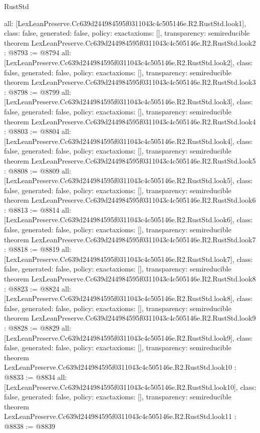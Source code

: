 \begin{lexlean}{RustStd}
\begin{coremodule}
{  all: [LexLeanPreserve.Cc639d244984595f0311043c4c505146e.R2.RustStd.look1],
  class: false,
  generated: false,
  policy: exact{axioms: []},
  transparency: semireducible
}
theorem LexLeanPreserve.Cc639d244984595f0311043c4c505146e.R2.RustStd.look2 : @8793 := @8794 {
  all: [LexLeanPreserve.Cc639d244984595f0311043c4c505146e.R2.RustStd.look2],
  class: false,
  generated: false,
  policy: exact{axioms: []},
  transparency: semireducible
}
theorem LexLeanPreserve.Cc639d244984595f0311043c4c505146e.R2.RustStd.look3 : @8798 := @8799 {
  all: [LexLeanPreserve.Cc639d244984595f0311043c4c505146e.R2.RustStd.look3],
  class: false,
  generated: false,
  policy: exact{axioms: []},
  transparency: semireducible
}
theorem LexLeanPreserve.Cc639d244984595f0311043c4c505146e.R2.RustStd.look4 : @8803 := @8804 {
  all: [LexLeanPreserve.Cc639d244984595f0311043c4c505146e.R2.RustStd.look4],
  class: false,
  generated: false,
  policy: exact{axioms: []},
  transparency: semireducible
}
theorem LexLeanPreserve.Cc639d244984595f0311043c4c505146e.R2.RustStd.look5 : @8808 := @8809 {
  all: [LexLeanPreserve.Cc639d244984595f0311043c4c505146e.R2.RustStd.look5],
  class: false,
  generated: false,
  policy: exact{axioms: []},
  transparency: semireducible
}
theorem LexLeanPreserve.Cc639d244984595f0311043c4c505146e.R2.RustStd.look6 : @8813 := @8814 {
  all: [LexLeanPreserve.Cc639d244984595f0311043c4c505146e.R2.RustStd.look6],
  class: false,
  generated: false,
  policy: exact{axioms: []},
  transparency: semireducible
}
theorem LexLeanPreserve.Cc639d244984595f0311043c4c505146e.R2.RustStd.look7 : @8818 := @8819 {
  all: [LexLeanPreserve.Cc639d244984595f0311043c4c505146e.R2.RustStd.look7],
  class: false,
  generated: false,
  policy: exact{axioms: []},
  transparency: semireducible
}
theorem LexLeanPreserve.Cc639d244984595f0311043c4c505146e.R2.RustStd.look8 : @8823 := @8824 {
  all: [LexLeanPreserve.Cc639d244984595f0311043c4c505146e.R2.RustStd.look8],
  class: false,
  generated: false,
  policy: exact{axioms: []},
  transparency: semireducible
}
theorem LexLeanPreserve.Cc639d244984595f0311043c4c505146e.R2.RustStd.look9 : @8828 := @8829 {
  all: [LexLeanPreserve.Cc639d244984595f0311043c4c505146e.R2.RustStd.look9],
  class: false,
  generated: false,
  policy: exact{axioms: []},
  transparency: semireducible
}
theorem LexLeanPreserve.Cc639d244984595f0311043c4c505146e.R2.RustStd.look10 : @8833 := @8834 {
  all: [LexLeanPreserve.Cc639d244984595f0311043c4c505146e.R2.RustStd.look10],
  class: false,
  generated: false,
  policy: exact{axioms: []},
  transparency: semireducible
}
theorem LexLeanPreserve.Cc639d244984595f0311043c4c505146e.R2.RustStd.look11 : @8838 := @8839 {
}
\end{coremodule}
\end{lexlean}
